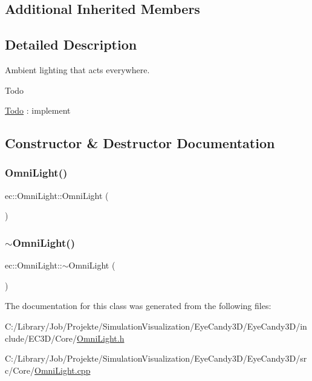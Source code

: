 \subsection*{Additional Inherited Members}


\subsection{Detailed Description}
Ambient lighting that acts everywhere. 

\begin{DoxyRefDesc}{Todo}
\item[\mbox{\hyperlink{todo__todo000003}{Todo}}]\+: implement \end{DoxyRefDesc}


\subsection{Constructor \& Destructor Documentation}
\mbox{\label{classec_1_1_omni_light_aa0240a42641c82a0363f569fdc312f23}} 
\subsubsection{\texorpdfstring{Omni\+Light()}{OmniLight()}}
{\footnotesize\ttfamily ec\+::\+Omni\+Light\+::\+Omni\+Light (\begin{DoxyParamCaption}{ }\end{DoxyParamCaption})\hspace{0.3cm}{\ttfamily [explicit]}}

\mbox{\label{classec_1_1_omni_light_a58c4d1aaf29e659c03ee1193cbca3eed}} 
\subsubsection{\texorpdfstring{$\sim$\+Omni\+Light()}{~OmniLight()}}
{\footnotesize\ttfamily ec\+::\+Omni\+Light\+::$\sim$\+Omni\+Light (\begin{DoxyParamCaption}{ }\end{DoxyParamCaption})\hspace{0.3cm}{\ttfamily [default]}}



The documentation for this class was generated from the following files\+:\begin{DoxyCompactItemize}
\item 
C\+:/\+Library/\+Job/\+Projekte/\+Simulation\+Visualization/\+Eye\+Candy3\+D/\+Eye\+Candy3\+D/include/\+E\+C3\+D/\+Core/\mbox{\hyperlink{_omni_light_8h}{Omni\+Light.\+h}}\item 
C\+:/\+Library/\+Job/\+Projekte/\+Simulation\+Visualization/\+Eye\+Candy3\+D/\+Eye\+Candy3\+D/src/\+Core/\mbox{\hyperlink{_omni_light_8cpp}{Omni\+Light.\+cpp}}\end{DoxyCompactItemize}
